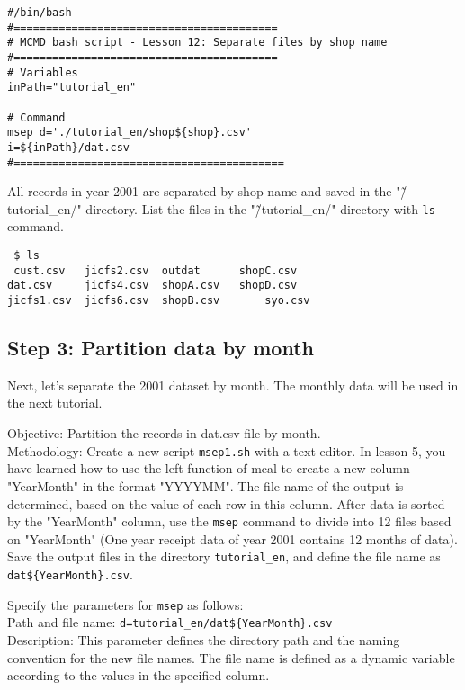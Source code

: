 \begin{verbatim}
#/bin/bash
#=========================================
# MCMD bash script - Lesson 12: Separate files by shop name
#=========================================
# Variables
inPath="tutorial_en"

# Command 
msep d='./tutorial_en/shop${shop}.csv'                   i=${inPath}/dat.csv
#==========================================
\end{verbatim}

All records in year 2001 are separated by shop name and saved in the "\~/tutorial\_en/" directory. List the files in the "\~/tutorial\_en/" directory with \verb|ls| command.  \\

 \begin{verbatim}
 $ ls
 cust.csv	jicfs2.csv	outdat		shopC.csv
dat.csv		jicfs4.csv	shopA.csv 	shopD.csv
jicfs1.csv	jicfs6.csv	shopB.csv		syo.csv
 \end{verbatim}

 \subsection{Step 3: Partition data by month}
 
 Next, let's separate the 2001 dataset by month. The monthly data will be used in the next tutorial. \\
 
 {\setlength{\parindent}{0cm}
 
 Objective:  Partition the records in dat.csv file by month.  \\ 

Methodology: Create a new script \verb|msep1.sh| with a text editor. In lesson 5, you have learned how to use the left function of mcal to create a new column "YearMonth" in the format "YYYYMM". The file name of the output is determined, based on the value of each row in this column. 
After data is sorted by the "YearMonth" column, use the  \verb|msep| command to divide into 12 files based on "YearMonth" (One year receipt data of year 2001 contains 12 months of data). 
Save the output files in the directory  \verb|tutorial_en|, and define the file name as \verb|dat${YearMonth}.csv|. 


Specify the parameters for \verb|msep| as follows: \\

Path and file name: 		\verb|d=tutorial_en/dat${YearMonth}.csv| \\
Description: 	This parameter defines the directory path and the naming convention for the new file names. The file name is defined as a dynamic variable according to the values in the specified column. 
}
 
